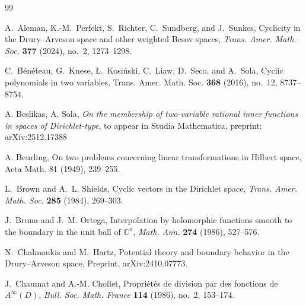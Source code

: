 \documentclass[a4paper,12pt]{amsart}
\theoremstyle{definition}
\begin{document}
\begin{thebibliography}{99}

A.~Aleman, K.-M.~Perfekt, S.~Richter, C.~Sundberg, and J.~Sunkes,
\newblock Cyclicity in the {D}rury--{A}rveson space and other weighted
{B}esov spaces,
\newblock \emph{Trans. Amer. Math. Soc.} \textbf{377} (2024),
no.~2, 1273--1298.

C.~B\'en\'eteau, G.~Knese, \L.~Kosi\'nski, C.~Liaw, D.~Seco,
and A.~Sola,
Cyclic polynomials in two variables,
Trans. Amer. Math. Soc. \textbf{368} (2016), no.~12, 8737--8754.

 A. Beslikas, A. Sola, \textit{On the membership of two-variable rational inner functions in spaces of Dirichlet-type}, to appear in Studia Mathematica, preprint: 	arXiv:2512.17388 

A. Beurling, On two problems concerning linear transformations in
Hilbert space, Acta Math. 81 (1949), 239--255.


L.~Brown and A.~L. Shields,
\newblock Cyclic vectors in the {Dirichlet} space,
\newblock \emph{Trans. Amer. Math. Soc.} \textbf{285} (1984), 269--303.

J.~Bruna and J.~M. Ortega,
\newblock Interpolation by holomorphic functions smooth to the boundary in the unit ball of $\mathbb{C}^n$,
\newblock \emph{Math. Ann.} \textbf{274} (1986), 527--576.


N.~Chalmoukis and M.~Hartz,
\newblock Potential theory and boundary behavior in the {D}rury--{A}rveson space,
\newblock Preprint, arXiv:2410.07773.


J.~Chaumat and A.-M. Chollet,
\newblock Propriétés de division par des fonctions de $A^\infty(D)$,
\newblock \emph{Bull. Soc. Math. France} \textbf{114} (1986), no.~2, 153--174.


\end{thebibliography}
\end{document}
